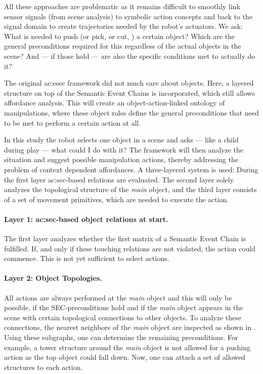 All these approaches are problematic as it remains difficult to smooth\-ly link sensor signals (\eg from scene analysis) to symbolic action concepts and back to the signal domain to create trajectories needed by the robot's actuators.
We ask: What is needed to push (or pick, or cut, \etc) a certain object? 
Which are the general preconditions required for this regardless of the actual objects in the scene? 
And --- if those hold --- are also the specific conditions met to actually do it?


The original \gls{ac:esec} framework did not much care about objects. 
Here, a layered structure on top of the Semantic Event Chains is incorporated, which still allows affordance analysis.
This will create an object-action-linked ontology of manipulations, where these object roles define the general preconditions that need to be met to perform a certain action at all. 


In this study the robot selects one object in a scene and asks --- like a child during play --- what could I do with it? 
The framework will then analyze the situation and suggest possible manipulation actions, thereby addressing the problem of context dependent affordances.
A three-layered system is used: During the first layer \gls{ac:sec}-based relations are evaluated.
The second layer solely analyzes the topological structure of the \emph{main} object, and the third layer consists of a set of movement primitives, which are needed to execute the action.


\paragraph{Layer 1: \gls{ac:sec}-based object relations at start.} The first layer analyzes wheth\-er the first matrix of a Semantic Event Chain is fulfilled. 
If, and only if these touching relations are not violated, the action could commence. 
This is not yet sufficient to select actions.


\paragraph{Layer 2: Object Topologies.}
All actions are always performed at the \emph{main} object and this will only be possible, if the SEC-preconditions hold and if the \emph{main} object appears in the scene with certain topological connections to other objects. 
To analyze these connections, the nearest neighbors of the \emph{main} object are inspected as shown in .
Using these subgraphs, one can determine the remaining preconditions. 
For example, a tower structure around the \emph{main} object is not allowed for a pushing action as the top object could fall down.
Now, one can attach a set of allowed structures to each action.

